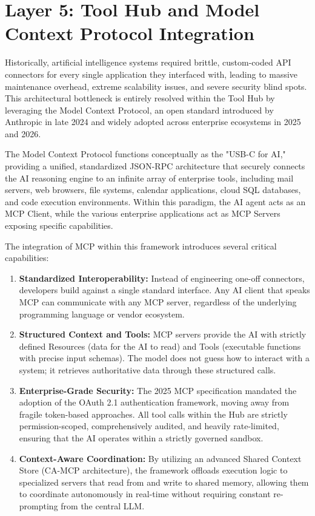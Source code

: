 \documentclass[12pt, a4paper]{report}
\begin{document}
\section{Layer 5: Tool Hub and Model Context Protocol Integration}
Historically, artificial intelligence systems required brittle, custom-coded API connectors for every single application they interfaced with, leading to massive maintenance overhead, extreme scalability issues, and severe security blind spots.\cite{redpilllabs2026} This architectural bottleneck is entirely resolved within the Tool Hub by leveraging the Model Context Protocol, an open standard introduced by Anthropic in late 2024 and widely adopted across enterprise ecosystems in 2025 and 2026.\cite{hojo2025}

The Model Context Protocol functions conceptually as the "USB-C for AI," providing a unified, standardized JSON-RPC architecture that securely connects the AI reasoning engine to an infinite array of enterprise tools, including mail servers, web browsers, file systems, calendar applications, cloud SQL databases, and code execution environments.\cite{hojo2025} Within this paradigm, the AI agent acts as an MCP Client, while the various enterprise applications act as MCP Servers exposing specific capabilities.\cite{linnify2026}

The integration of MCP within this framework introduces several critical capabilities:
\begin{enumerate}
    \item \textbf{Standardized Interoperability:} Instead of engineering one-off connectors, developers build against a single standard interface. Any AI client that speaks MCP can communicate with any MCP server, regardless of the underlying programming language or vendor ecosystem.\cite{gpttrainer2026}
    \item \textbf{Structured Context and Tools:} MCP servers provide the AI with strictly defined Resources (data for the AI to read) and Tools (executable functions with precise input schemas).\cite{redpilllabs2026} The model does not guess how to interact with a system; it retrieves authoritative data through these structured calls.\cite{redpilllabs2026}
    \item \textbf{Enterprise-Grade Security:} The 2025 MCP specification mandated the adoption of the OAuth 2.1 authentication framework, moving away from fragile token-based approaches.\cite{devto2026} All tool calls within the Hub are strictly permission-scoped, comprehensively audited, and heavily rate-limited, ensuring that the AI operates within a strictly governed sandbox.\cite{hojo2025}
    \item \textbf{Context-Aware Coordination:} By utilizing an advanced Shared Context Store (CA-MCP architecture), the framework offloads execution logic to specialized servers that read from and write to shared memory, allowing them to coordinate autonomously in real-time without requiring constant re-prompting from the central LLM.\cite{arxiv2601}
\end{enumerate}
\end{document}
